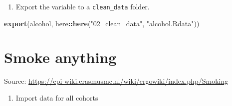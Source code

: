 \documentclass[]{book}
\newenvironment{Shaded}{\begin{snugshade}}{\end{snugshade}}
\newcommand{\KeywordTok}[1]{\textcolor[rgb]{0.13,0.29,0.53}{\textbf{#1}}}
\newcommand{\NormalTok}[1]{#1}
\newcommand{\OperatorTok}[1]{\textcolor[rgb]{0.81,0.36,0.00}{\textbf{#1}}}
\newcommand{\StringTok}[1]{\textcolor[rgb]{0.31,0.60,0.02}{#1}}
\providecommand{\tightlist}{%
  \setlength{\itemsep}{0pt}\setlength{\parskip}{0pt}}
\begin{document}
\begin{enumerate}
\def\labelenumi{\arabic{enumi}.}
\setcounter{enumi}{6}
\tightlist
\item
  Export the variable to a \texttt{clean\_data} folder.
\end{enumerate}

\begin{Shaded}
\begin{Highlighting}[]
\KeywordTok{export}\NormalTok{(alcohol, here}\OperatorTok{::}\KeywordTok{here}\NormalTok{(}\StringTok{"02_clean_data"}\NormalTok{, }\StringTok{"alcohol.Rdata"}\NormalTok{))}
\end{Highlighting}
\end{Shaded}

\hypertarget{smoke}{%
\chapter{Smoke anything}\label{smoke}}

Source: \url{https://epi-wiki.erasmusmc.nl/wiki/ergowiki/index.php/Smoking}

\begin{enumerate}
\def\labelenumi{\arabic{enumi}.}
\tightlist
\item
  Import data for all cohorts
\end{enumerate}
\end{document}
